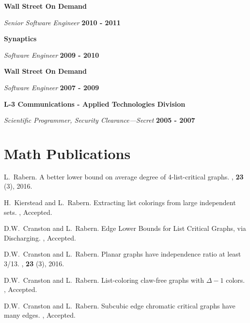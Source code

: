 \documentclass[margin,line]{res}
\begin{document}
\begin{resume}
{\bf Wall Street On Demand}

\vspace{-.4cm}
{\em Senior Software Engineer} \hfill {\bf 2010 - 2011}

{\bf Synaptics}

\vspace{-.4cm}
{\em Software Engineer} \hfill {\bf 2009 - 2010}

{\bf Wall Street On Demand}

\vspace{-.4cm}
{\em Software Engineer} \hfill {\bf 2007 - 2009}

{\bf L-3 Communications - Applied Technologies Division}

\vspace{-.4cm}
{\em Scientific Programmer, Security Clearance---Secret} \hfill {\bf 2005 - 2007}

\section{\sc Math Publications}

\begin{enumerate}[{[}1{]}]

\item
L.~Rabern.
\newblock A better lower bound on average degree of 4-list-critical graphs.
, \textbf{23} (3), 2016.
	
	\smallskip
	
	\item
H.~Kierstead and L.~Rabern.
\newblock Extracting list colorings from large independent sets.
, Accepted.

\smallskip

	\item
	D.W.~Cranston and L.~Rabern.
	\newblock Edge Lower Bounds for List Critical Graphs, via Discharging.
	, Accepted.
	\smallskip

\item
D.W.~Cranston and L.~Rabern.
\newblock Planar graphs have independence ratio at least 3/13.
, \textbf{23} (3), 2016.
\smallskip

\item
D.W.~Cranston and L.~Rabern.
\newblock List-coloring claw-free graphs with $\Delta - 1$ colors.
, Accepted.
\smallskip

\item
D.W.~Cranston and L.~Rabern.
\newblock Subcubic edge chromatic critical graphs have many edges.
, Accepted.
\smallskip


\end{enumerate}
\end{resume}
\end{document}
